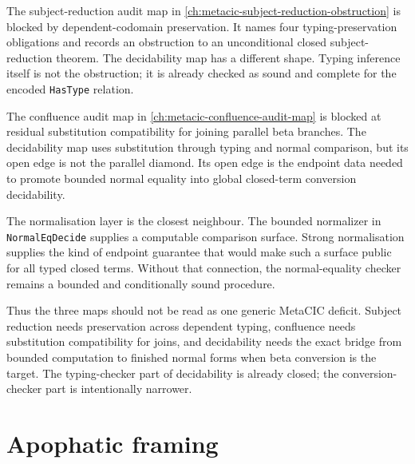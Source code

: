 The subject-reduction audit map in
\autoref{ch:metacic-subject-reduction-obstruction} is blocked by
dependent-codomain preservation. It names four typing-preservation
obligations and records an obstruction to an unconditional closed
subject-reduction theorem. The decidability map has a different shape. Typing
inference itself is not the obstruction; it is already checked as sound and
complete for the encoded \texttt{HasType} relation.

The confluence audit map in \autoref{ch:metacic-confluence-audit-map} is
blocked at residual substitution compatibility for joining parallel beta
branches. The decidability map uses substitution through typing and normal
comparison, but its open edge is not the parallel diamond. Its open edge is
the endpoint data needed to promote bounded normal equality into global
closed-term conversion decidability.

The normalisation layer is the closest neighbour. The bounded normalizer in
\texttt{NormalEqDecide} supplies a computable comparison surface. Strong
normalisation supplies the kind of endpoint guarantee that would make such a
surface public for all typed closed terms. Without that connection, the
normal-equality checker remains a bounded and conditionally sound procedure.


Thus the three maps should not be read as one generic MetaCIC deficit. Subject
reduction needs preservation across dependent typing, confluence needs
substitution compatibility for joins, and decidability needs the exact bridge
from bounded computation to finished normal forms when beta conversion is the
target. The typing-checker part of decidability is already closed; the
conversion-checker part is intentionally narrower.

\section{Apophatic framing}
\label{sec:metacic-decidable-audit-map-apophatic}

